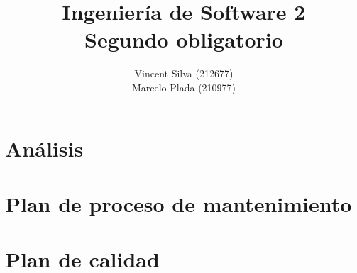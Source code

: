 

%

\title{Ingeniería de Software 2\\Segundo obligatorio}
\author{Vincent Silva (212677) \\Marcelo Plada (210977) \\}




\maketitle

\tableofcontents

\chapter{Análisis}


\newpage


\newpage


\newpage



\newpage
\chapter{Plan de proceso de mantenimiento}
    
    \newpage
    
    \newpage
    
    \newpage
    
    \newpage
    
    \newpage
    
    \newpage
    
    \newpage
        
    \newpage
        
    \newpage
    
    \newpage
    
    \newpage
    
    \newpage
    
    \newpage
\chapter{Plan de calidad}
    

